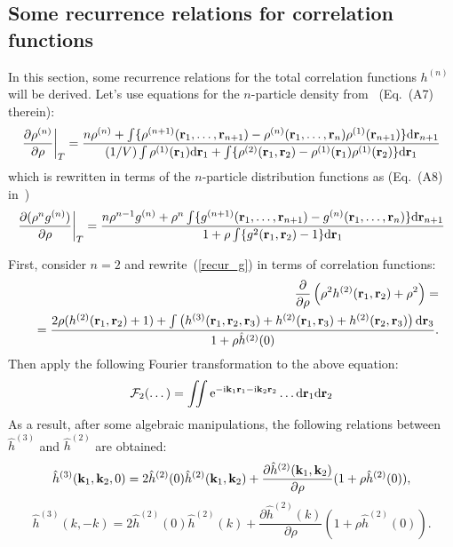 \subsection{Some recurrence relations for correlation functions}
In this section, some recurrence relations for the total correlation functions $h^{(n)}$ will be derived. Let's use equations for the $n$-particle density from~\cite{Schofield1966} (Eq.~(A7) therein):
\begin{equation}
	\frac{\partial\rho^{(n)}}{\partial\rho}\bigg|_T = \frac{n\rho^{(n)} 
		+ \int \{ \rho^{(n+1)}(\vb r_1, \dotsc, \vb r_{n+1}) - \rho^{(n)}(\vb r_1, \dotsc, \vb r_n) \rho^{(1)}(\vb r_{n+1}) \} {\rm d} \vb r_{n+1}}
	{(1/V)\int \rho^{(1)}(\vb r_1) {\rm d} \vb r_1 + \int \{ \rho^{(2)}(\vb r_1, \vb r_2) - \rho^{(1)}(\vb r_1)\rho^{(1)}(\vb r_2) \} {\rm d} \vb r_1}
\end{equation}
which is rewritten in terms of the $n$-particle distribution functions as (Eq.~(A8) in~\cite{Schofield1966})
\begin{equation}
	\label{recur_g}
	\frac{\partial (\rho^n g^{(n)})}{\partial\rho} \bigg|_T 
	= \frac{n\rho^{n-1}g^{(n)} + \rho^n \int \{g^{(n+1)}(\vb r_1, \dots, \vb r_{n+1}) - g^{(n)}(\vb r_1, \dots, \vb r_n)\} {\rm d} \vb r_{n+1}}
	{1 + \rho\int \{g^2(\vb r_1, \vb r_2) - 1\} {\rm d} \vb r_1}
\end{equation}

First, consider $n=2$ and rewrite~(\ref{recur_g}) in terms of correlation functions:
\begin{eqnarray}
	&&\frac{\partial}{\partial\rho}\left(\rho^2 h^{(2)}(\vb r_1, \vb r_2) + \rho^2\right) =
	\nonumber\\
	&&= \frac
	{2\rho(h^{(2)}(\vb r_1, \vb r_2) + 1) + \int \left(h^{(3)}(\vb r_1, \vb r_2, \vb r_3) + h^{(2)}(\vb r_1, \vb r_3) + h^{(2)}(\vb r_2, \vb r_3) \right) {\rm d}{\vb r_3}}
	{1 + \rho \hat{h}^{(2)}(0)}.
\end{eqnarray}
Then apply the following Fourier transformation to the above equation:
\begin{equation}
	\mathcal{F}_2(\dots) = \iint {\rm e}^{-{\rm i}\vb k_1 \vb r_1 - {\rm i} \vb k_2 \vb r_2} \dots {\rm d} \vb r_1 {\rm d} \vb r_2
\end{equation}
As a result, after some algebraic manipulations, the following relations between $\hat{h}^{(3)}$ and $\hat{h}^{(2)}$ are obtained:
\begin{equation}
	\hat{h}^{(3)}(\vb k_1, \vb k_2, 0) = 2 \hat{h}^{(2)}(0)\hat{h}^{(2)}(\vb k_1, \vb k_2) + \frac{\partial \hat{h}^{(2)}(\vb k_1, \vb k_2)}{\partial\rho}(1 + \rho\hat{h}^{(2)}(0)),
\end{equation}
\begin{equation}
	\label{recur_h3_h2}
	\hat{h}^{(3)}(k, -k) = 2 \hat{h}^{(2)}(0)\hat{h}^{(2)}(k) + \frac{\partial \hat{h}^{(2)}(k)}{\partial\rho}(1 + \rho\hat{h}^{(2)}(0)).
\end{equation}

